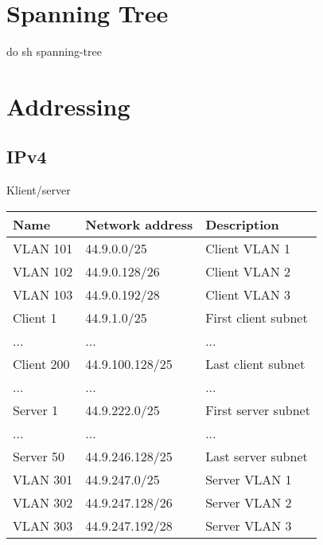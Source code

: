 \documentclass[english,master,dept460,male,cpp,cpdeclaration]{diploma}
\begin{document}
\newpage
\section{Spanning Tree}
\label{sec:Sec03}
\noindent do sh spanning-tree


\newpage
\section{Addressing}
\label{sec:Sec04}

\subsection{IPv4}
\label{subsec:Sec041}
\noindent Klient/server
\begin{center}
	\begin{tabular}{l|l|l}
		Name & Network address & Description \\
		\hline
		VLAN 101 & 44.9.0.0/25 & Client VLAN 1\\
		VLAN 102 & 44.9.0.128/26 & Client VLAN 2\\
		VLAN 103 & 44.9.0.192/28 & Client VLAN 3\\
		Client 1 & 44.9.1.0/25 & First client subnet\\
		... & ... & ...\\
		Client 200 & 44.9.100.128/25 & Last client subnet\\
		... & ... & ...\\
		Server 1 & 44.9.222.0/25 & First server subnet\\
		... & ... & ...\\
		Server 50 & 44.9.246.128/25 & Last server subnet\\
		VLAN 301 & 44.9.247.0/25 & Server VLAN 1\\
		VLAN 302 & 44.9.247.128/26 & Server VLAN 2\\
		VLAN 303 & 44.9.247.192/28 & Server VLAN 3\\
	\end{tabular}
\end{center}
\end{document}
